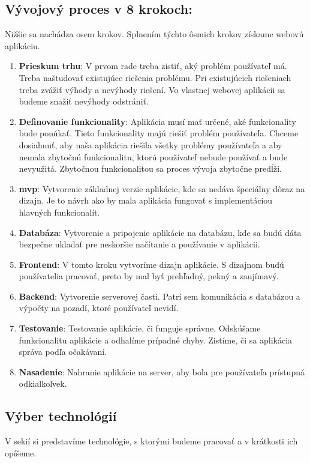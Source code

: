 \subsection{Vývojový proces v 8 krokoch\cite{create_web_app}:}
\indent \indent Nižšie sa nachádza osem krokov. Splnením týchto ôsmich krokov získame webovú aplikáciu.
\begin{enumerate}
    \item \textbf{Prieskum trhu}: V prvom rade treba zistiť, aký problém používateľ má. Treba naštudovať existujúce riešenia problému. Pri existujúcich riešeniach treba zvážiť výhody a nevýhody riešení. Vo vlastnej webovej aplikácii sa budeme snažiť nevýhody odstrániť.
    \item \textbf{Definovanie funkcionality}: Aplikácia musí mať určené, aké funkcionality bude ponúkať. Tieto funkcionality majú riešiť problém používateľa. Chceme dosiahnuť, aby naša aplikácia riešila všetky problémy používateľa a aby nemala zbytočnú funkcionalitu, ktorú používateľ nebude používať a bude nevyužitá. Zbytočnou funkcionalitou sa proces vývoja zbytočne predĺži. 
    \item  \textbf{\acrshort{mvp}}: Vytvorenie základnej verzie aplikácie, kde sa nedáva špeciálny dôraz na dizajn. Je to návrh ako by mala aplikácia fungovať s implementáciou hlavných funkcionalít.
    \item \textbf{Databáza}: Vytvorenie a pripojenie aplikácie na databázu, kde sa budú dáta bezpečne ukladať pre neskoršie načítanie a používanie v aplikácii.
    \item \textbf{Frontend}: V tomto kroku vytvoríme dizajn aplikácie. S dizajnom budú používatelia pracovať, preto by mal byť prehľadný, pekný a zaujímavý.
    \item \textbf{Backend}: Vytvorenie serverovej časti. Patrí sem komunikácia s databázou a výpočty na pozadí, ktoré používateľ nevidí.
    \item \textbf{Testovanie}: Testovanie aplikácie, či funguje správne. Odskúšame funkcionalitu aplikácie a odhalíme prípadné chyby. Zistíme, či sa aplikácia správa podľa očakávaní.
    \item \textbf{Nasadenie}: Nahranie aplikácie na server, aby bola pre používateľa prístupná odkialkoľvek.
\end{enumerate}


\subsection{Výber technológií}
\indent \indent V sekií si predstavíme technológie, s ktorými budeme pracovať a v krátkosti ich opíšeme. 

